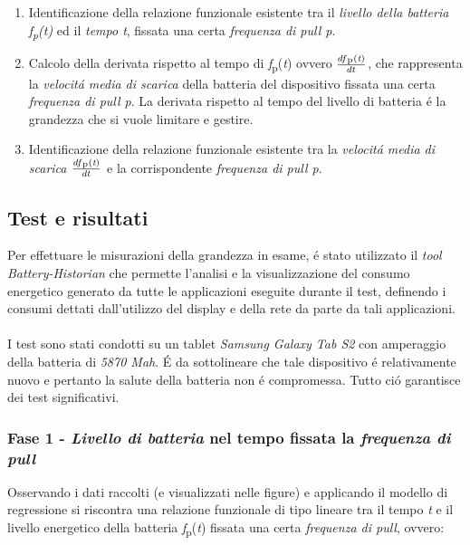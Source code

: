 \documentclass{article}
\begin{document}
\begin{enumerate}
\item{Identificazione della relazione funzionale esistente tra il \textit{livello della batteria \textit{f}\textsubscript{p}(\textit{t})} ed il \textit{tempo t}, fissata una certa \textit{frequenza di pull p}.}
\item{Calcolo della derivata rispetto al tempo di \textit{f}\textsubscript{p}(\textit{t}) ovvero \(\frac{df\textsubscript{p}(\textit{t})}{dt}\), che rappresenta la \textit{velocit\'a media di scarica} della batteria del dispositivo fissata una certa \textit{frequenza di pull p}. La derivata rispetto al tempo del livello di batteria \'e la grandezza che si vuole limitare e gestire.}
\item{Identificazione della relazione funzionale esistente tra la \textit{velocit\'a media di scarica \(\frac{df\textsubscript{p}(\textit{t})}{dt}\)} e la corrispondente \textit{frequenza di pull p}.}
\end{enumerate} 

\subsection{Test e risultati}

Per effettuare le misurazioni della grandezza in esame, \'e stato utilizzato il \textit{tool Battery-Historian} che permette l'analisi e la visualizzazione del consumo energetico generato da tutte le applicazioni eseguite durante il test, definendo i consumi dettati dall'utilizzo del display e della rete da parte da tali applicazioni.
\\\\
I test sono stati condotti su un tablet \textit{Samsung Galaxy Tab S2} con amperaggio della batteria di \textit{5870 Mah}. \'E da sottolineare che tale dispositivo \'e relativamente nuovo e pertanto la salute della batteria non \'e compromessa. Tutto ci\'o garantisce dei test significativi.

\subsubsection{Fase 1 - \textit{Livello di batteria} nel tempo fissata la \textit{frequenza di pull}}
Osservando i dati raccolti (e visualizzati nelle figure) e applicando il modello di regressione si riscontra una relazione funzionale di tipo lineare tra il tempo \textit{t} e il livello energetico della batteria \textit{f}\textsubscript{p}(\textit{t}) fissata una certa \textit{frequenza di pull}, ovvero:
\end{document}
